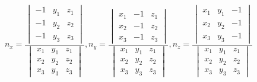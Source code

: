 \documentclass[12pt]{article}
\begin{document}
$$n_{x}= \frac{\begin{vmatrix}
-1 & y_{1}  & z_{1} \\
-1 & y_{2}  & z_{2} \\
-1 & y_{3}  & z_{3} 
\end{vmatrix} }{\begin{vmatrix}
x_{1} & y_{1}  & z_{1} \\
x_{2} & y_{2}  & z_{2} \\
x_{3} & y_{3}  & z_{3} 
\end{vmatrix}},
n_{y}  = \frac{\begin{vmatrix}
x_{1} & -1  & z_{1} \\
x_{2} & -1  & z_{2} \\
x_{3} & -1  & z_{3} 
\end{vmatrix} }{\begin{vmatrix}
x_{1} & y_{1}  & z_{1} \\
x_{2} & y_{2}  & z_{2} \\
x_{3} & y_{3}  & z_{3} 
\end{vmatrix}},
n_{z}  = \frac{\begin{vmatrix}
x_{1} & y_{1}  & -1 \\
x_{2} & y_{2}  & -1 \\
x_{3} & y_{3}  & -1  
\end{vmatrix} }{\begin{vmatrix}
x_{1} & y_{1}  & z_{1} \\
x_{2} & y_{2}  & z_{2} \\
x_{3} & y_{3}  & z_{3} 
\end{vmatrix}}$$
\\
\end{document}
